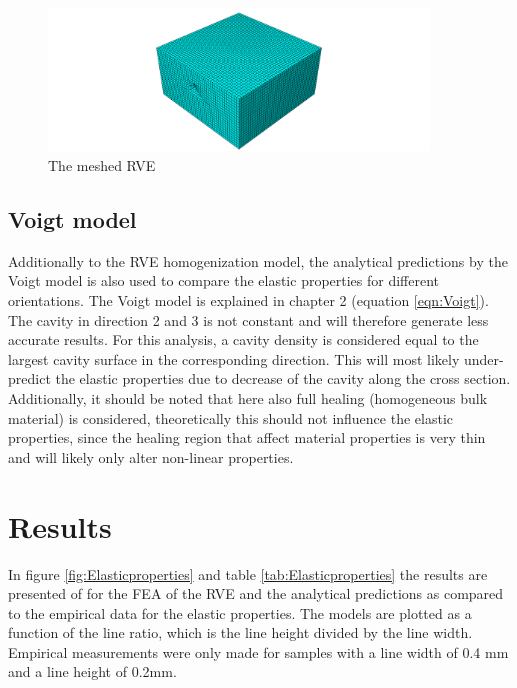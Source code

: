 \begin{figure}[htb]
    \centering
    \includegraphics[width=0.90\textwidth]{chapter_6_Elasticmodelling/figures/mesh.png}
    \caption{The meshed RVE}
    \label{fig:mesh}
\end{figure}

\subsection{Voigt model}
Additionally to the RVE homogenization model, the analytical predictions by the Voigt model is also used to compare the elastic properties for different orientations. The Voigt model is explained in chapter 2 (equation \ref{eqn:Voigt}). The cavity in direction 2 and 3 is not constant and will therefore generate less accurate results. For this analysis, a cavity density is considered equal to the largest cavity surface in the corresponding direction. This will most likely under-predict the elastic properties due to decrease of the cavity along the cross section. Additionally, it should be noted that here also full healing (homogeneous bulk material) is considered, theoretically this should not influence the elastic properties, since the healing region that affect material properties is very thin and will likely only alter non-linear properties. 

\section{Results}
In figure \ref{fig:Elasticproperties} and table \ref{tab:Elasticproperties} the results are presented of for the FEA of the RVE and the analytical predictions as compared to the empirical data for the elastic properties.  The models are plotted as a function of the line ratio, which is the line height divided by the line width. Empirical measurements were only made for samples with a line width of 0.4 mm and a line height of 0.2mm.

